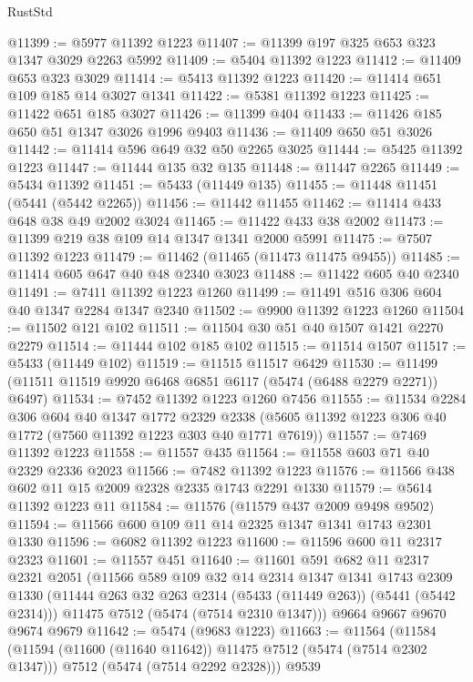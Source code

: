 \begin{lexlean}{RustStd}
\begin{coremodule}
@11399 := @5977 @11392 @1223
@11407 := @11399 @197 @325 @653 @323 @1347 @3029 @2263 @5992
@11409 := @5404 @11392 @1223
@11412 := @11409 @653 @323 @3029
@11414 := @5413 @11392 @1223
@11420 := @11414 @651 @109 @185 @14 @3027 @1341
@11422 := @5381 @11392 @1223
@11425 := @11422 @651 @185 @3027
@11426 := @11399 @404
@11433 := @11426 @185 @650 @51 @1347 @3026 @1996 @9403
@11436 := @11409 @650 @51 @3026
@11442 := @11414 @596 @649 @32 @50 @2265 @3025
@11444 := @5425 @11392 @1223
@11447 := @11444 @135 @32 @135
@11448 := @11447 @2265
@11449 := @5434 @11392
@11451 := @5433 (@11449 @135)
@11455 := @11448 @11451 (@5441 (@5442 @2265))
@11456 := @11442 @11455
@11462 := @11414 @433 @648 @38 @49 @2002 @3024
@11465 := @11422 @433 @38 @2002
@11473 := @11399 @219 @38 @109 @14 @1347 @1341 @2000 @5991
@11475 := @7507 @11392 @1223
@11479 := @11462 (@11465 (@11473 @11475 @9455))
@11485 := @11414 @605 @647 @40 @48 @2340 @3023
@11488 := @11422 @605 @40 @2340
@11491 := @7411 @11392 @1223 @1260
@11499 := @11491 @516 @306 @604 @40 @1347 @2284 @1347 @2340
@11502 := @9900 @11392 @1223 @1260
@11504 := @11502 @121 @102
@11511 := @11504 @30 @51 @40 @1507 @1421 @2270 @2279
@11514 := @11444 @102 @185 @102
@11515 := @11514 @1507
@11517 := @5433 (@11449 @102)
@11519 := @11515 @11517 @6429
@11530 := @11499 (@11511 @11519 @9920 @6468 @6851 @6117 (@5474 (@6488 @2279 @2271)) @6497)
@11534 := @7452 @11392 @1223 @1260 @7456
@11555 := @11534
    @2284
    @306
    @604
    @40
    @1347
    @1772
    @2329
    @2338
    (@5605 @11392 @1223 @306 @40 @1772 (@7560 @11392 @1223 @303 @40 @1771 @7619))
@11557 := @7469 @11392 @1223
@11558 := @11557 @435
@11564 := @11558 @603 @71 @40 @2329 @2336 @2023
@11566 := @7482 @11392 @1223
@11576 := @11566 @438 @602 @11 @15 @2009 @2328 @2335 @1743 @2291 @1330
@11579 := @5614 @11392 @1223 @11
@11584 := @11576 (@11579 @437 @2009 @9498 @9502)
@11594 := @11566 @600 @109 @11 @14 @2325 @1347 @1341 @1743 @2301 @1330
@11596 := @6082 @11392 @1223
@11600 := @11596 @600 @11 @2317 @2323
@11601 := @11557 @451
@11640 := @11601
    @591
    @682
    @11
    @2317
    @2321
    @2051
    (@11566
      @589
      @109
      @32
      @14
      @2314
      @1347
      @1341
      @1743
      @2309
      @1330
      (@11444 @263 @32 @263 @2314 (@5433 (@11449 @263)) (@5441 (@5442 @2314)))
      @11475
      @7512
      (@5474 (@7514 @2310 @1347)))
    @9664
    @9667
    @9670
    @9674
    @9679
@11642 := @5474 (@9683 @1223)
@11663 := @11564
    (@11584
      (@11594 (@11600 (@11640 @11642)) @11475 @7512 (@5474 (@7514 @2302 @1347)))
      @7512
      (@5474 (@7514 @2292 @2328)))
    @9539

\end{coremodule}
\end{lexlean}

